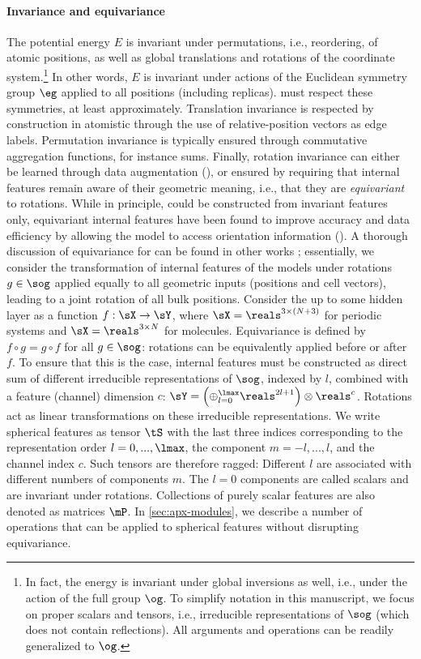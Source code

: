 \documentclass[10pt]{article}
\begin{document}
\paragraph{Invariance and equivariance}
The potential energy $E$ is invariant under
permutations, i.e., reordering, of atomic positions,
as well as global translations and rotations of the coordinate system.\footnote{In fact, the energy is invariant under global inversions as well, i.e., under the action of the full group $\og$. To simplify notation in this manuscript, we focus on proper scalars and tensors, i.e., irreducible representations of $\sog$ (which does not contain reflections). All arguments and operations can be readily generalized to $\og$.} In other words, $E$ is invariant under actions of the Euclidean symmetry group $\eg$ applied to all positions (including replicas).
\mlps must respect these symmetries, at least approximately.
Translation invariance is respected by construction in atomistic \gnns{} through the use of relative-position vectors as edge labels.
Permutation invariance is typically ensured through commutative aggregation functions, for instance sums.
Finally, rotation invariance can either be learned through data augmentation (\cite{pc2023,lpc2024,dapbc2026pre}), or ensured by requiring that internal features remain aware of their geometric meaning, i.e., that they are \emph{equivariant} to rotations.
While in principle, \mlps could be constructed from invariant features only, equivariant internal features have been found to improve accuracy and data efficiency by allowing the model to access orientation information (\cite{tskylkr2018,bmsgmkmsk2022,bksoc2022}).
A thorough discussion of equivariance for \mlps can be found in other works \citep{s2021,um2024};
essentially, we consider the transformation of internal features of the models under rotations $g \in \sog$ applied equally to all geometric inputs (positions and cell vectors), leading to a joint rotation of all bulk positions.
Consider the \mlp up to some hidden layer as a function $f: \sX \rightarrow \sY$, where $ \sX = {\reals^{3 \times (N+3)}}$ for periodic systems and $\sX = {\reals^{3\times N}}$ for molecules.
Equivariance is defined by $f \circ g = g \circ f$ for all $g \in \sog$: rotations can be equivalently applied before or after $f$.
To ensure that this is the case, internal features must be constructed as direct sum of different irreducible representations of $\sog$, indexed by $l$, combined with a feature (channel) dimension $c$: $\sY = \left( \oplus_{l=0}^{\lmax} \reals^{2l+1} \right) \otimes \reals^c$.
Rotations act as linear transformations on these irreducible representations.
We write spherical features as tensor $\tS$ with the last three indices corresponding to the representation order $l=0,...,\lmax$, the component $m=-l,...,l$, and the channel index $c$. Such tensors are therefore ragged: Different $l$ are associated with different numbers of components $m$. The $l=0$ components are called scalars and are invariant under rotations. Collections of purely scalar features are also denoted as matrices $\mP$. In \cref{sec:apx-modules}, we describe a number of operations that can be applied to spherical features without disrupting equivariance.
\end{document}
